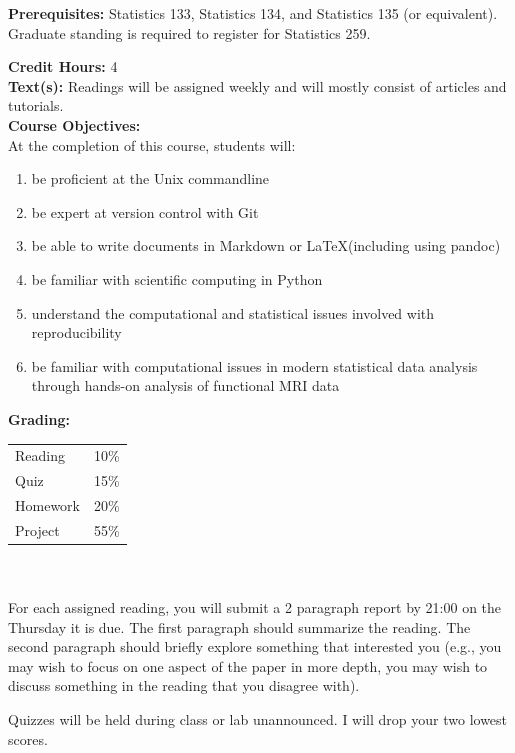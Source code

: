 \documentclass[11pt]{article}
\begin{document}
\textbf {Prerequisites:} Statistics 133, Statistics 134, and Statistics 135
(or equivalent). Graduate standing is required to register for Statistics 259.

\textbf {Credit Hours:} 4 \\

\textbf {\large Text(s):} 
Readings will be assigned weekly and will mostly consist of articles and tutorials. \\

\textbf {\large Course Objectives:} \\
At the completion of this course, students will:
\begin{enumerate} \itemsep-0.4em
  \item be proficient at the Unix commandline
  \item be expert at version control with Git
  \item be able to write documents in Markdown or \LaTeX (including using
        pandoc)
  \item be familiar with scientific computing in Python
  \item understand the computational and statistical issues involved with
        reproducibility
  \item be familiar with computational issues in modern statistical data
        analysis through hands-on analysis of functional MRI data
\end{enumerate}

\textbf {\large Grading:} \\
\hspace*{40mm}
\begin{tabular}{ l l }
Reading  & 10\% \\
Quiz  & 15\% \\
Homework & 20\% \\
Project  & 55\%
\end{tabular} \\\\

For each assigned reading, you will submit a 2 paragraph report
by 21:00 on the Thursday it is due.
The first paragraph should summarize the reading.  The second paragraph
should briefly explore something that interested you (e.g., you
may wish to focus on one aspect of the paper in more depth, you
may wish to discuss something in the reading that you disagree
with).

Quizzes will be held during class or lab unannounced.  I will drop your
two lowest scores.
\end{document}
